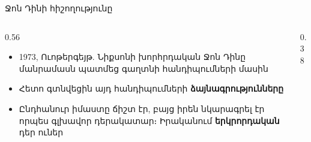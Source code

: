 \begin{frame}{Ջոն Դինի հիշողությունը}
  \begin{columns}[c]
    \begin{column}{0.56\textwidth}
      \begin{itemize}
        \item 1973, Ուոթերգեյթ. Նիքսոնի խորհրդական Ջոն Դինը մանրամասն պատմեց գաղտնի հանդիպումների մասին
        \item<2-> Հետո գտնվեցին այդ հանդիպումների \textbf{ձայնագրությունները} 
        \item<3-> Ընդհանուր իմաստը ճիշտ էր, բայց իրեն նկարագրել էր որպես գլխավոր դերակատար։ Իրականում \textbf{երկրորդական} դեր ուներ
      \end{itemize}
    \end{column}
    \begin{column}{0.38\textwidth}
      \centering
      \par\medskip
    \end{column}
  \end{columns}
\end{frame}

